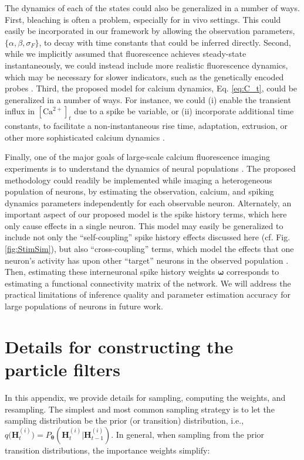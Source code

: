 \documentclass[10pt]{article}
\providecommand{\ve}[1]{\boldsymbol{#1}}
\providecommand{\ve}[1]{\boldsymbol{#1}}
\newcommand{\thetn}{\ve{\theta}}
\newcommand{\p}{P_{\thetn}}
\newcommand{\q}{q\big(\ve{H}_t^{(i)}\big)}
\newcommand{\Ca}{[\text{Ca}^{2+}]}
\begin{document}
The dynamics of each of the states could also be generalized in a number of ways. First, bleaching is often a problem, especially for in vivo settings.  This could easily be incorporated in our framework by allowing the observation parameters, $\{\alpha, \beta, \sigma_F\}$, to decay with time constants that could be inferred directly. Second, while we implicitly assumed that fluorescence achieves steady-state instantaneously, we could instead include more realistic fluorescence dynamics, which may be necessary for slower indicators, such as the genetically encoded probes \cite{TayYue07}. Third, the proposed model for calcium dynamics, Eq. \ref{eq:C_t}, could be generalized in a number of ways.  For instance, we could (i) enable the transient influx in $\Ca_t$ due to a spike be variable, or (ii) incorporate additional time constants, to facilitate a non-instantaneous rise time, adaptation, extrusion, or other more sophisticated calcium dynamics \cite{TsienTsien90}.   

Finally, one of the major goals of large-scale calcium fluorescence imaging experiments is to understand the dynamics of neural populations \cite{IkegayaYuste04}. The proposed methodology could readily be implemented while imaging a heterogeneous population of neurons, by estimating the observation, calcium, and spiking dynamics parameters independently for each observable neuron. Alternately, an important aspect of our proposed model is the spike history terms, which here only cause effects in a single neuron.  This model may easily be generalized to include not only the ``self-coupling'' spike history effects discussed here (cf. Fig. \ref{fig:StimSim}), but also ``cross-coupling'' terms, which model the effects that one neuron's activity has upon other ``target'' neurons in the observed population \cite{Paninski04c, TruccoloBrown05, Pillow08}.  Then, estimating these interneuronal spike history weights $\ve{\omega}$ corresponds to estimating a functional connectivity matrix of the network.  We will address the practical limitations of inference quality and parameter estimation accuracy for large populations of neurons in future work.

\newpage \appendix
\section{Details for constructing the particle filters} \label{sec:cond_samp}

In this appendix, we provide details for sampling, computing the weights, and resampling.  The simplest and most common sampling strategy is to let the sampling distribution be the prior (or transition) distribution, i.e., $\q=\p(\ve{H}_t^{(i)} | \ve{H}_{t-1}^{(i)})$. In general, when sampling from the prior transition distributions, the importance weights simplify:
\end{document}
